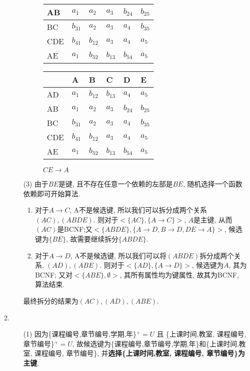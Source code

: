 \documentclass[10pt, a4paper]{article}
\begin{document}
\begin{enumerate}
\begin{enumerate}
\begin{figure}[H]
\begin{minipage}[b]{0.5\linewidth}
\begin{tabular}{|l|l|l|l|l|l|}
						AB  & $a_1$ & $a_2$  & $a_3$  & $b_{24}$ & $b_{25}$  \\ \hline
						BC  & $b_{31}$ &  $a_2$ & $a_3$ & $a_4$ & $b_{35}$ \\ \hline
						CDE & $b_{41}$ & $b_{12}$ & $a_3$ & $a_4$ & $a_5$ \\ \hline
						AE  & $a_1$ & $b_{52}$ & $b_{13}$ & $b_{54}$ & $a_5$ \\ \hline
						\end{tabular}
						\caption{$DE\to C$}\label{tab:5}
				\end{minipage}
				\begin{minipage}[b]{0.5\linewidth}
					\centering
					\begin{tabular}{|l|l|l|l|l|l|}
						\hline
							& A & B & C & D & E \\ \hline
						AD  & $a_1$ & $b_{12}$ & $b_{13}$  & $a_4$  & $a_5$  \\ \hline
						AB  & $a_1$ & $a_2$  & $a_3$  & $b_{24}$ & $b_{25}$  \\ \hline
						BC  & $b_{31}$ &  $a_2$ & $a_3$ & $a_4$ & $b_{35}$ \\ \hline
						CDE & $b_{41}$ & $b_{12}$ & $a_3$ & $a_4$ & $a_5$ \\ \hline
						AE  & $a_1$ & $b_{52}$ & $b_{13}$ & $b_{54}$ & $a_5$ \\ \hline
						\end{tabular}
						\caption{$CE\to A$}\label{tab:6}
				\end{minipage}
			\end{figure}
			\item[(3)] 由于$BE$是键, 且不存在任意一个依赖的左部是$BE$, 随机选择一个函数依赖即可开始算法.
			\begin{enumerate}
				\item 对于$A\to C$, A不是候选键, 所以我们可以拆分成两个关系$(AC), (ABDE)$. 则对于$<\{AC\}, \{A\to C\}>$, $A$是主键, 从而$(AC)$是BCNF;又$<\{ABDE\}, \{A\to D, B\to D, DE\to A\}>$, 候选键为$\{BE\}$, 故需要继续拆分$\{ABDE\}$.
				\item 对于$A\to D$, A不是候选键, 所以我们可以将$(ABDE)$拆分成两个关系, $(AD), (ABE)$. 则对于$<\{AD\}, \{A\to D\}>$, 候选键为$A$, 其为BCNF; 又对$<\{ABE\}, \emptyset >$, 其所有属性均为键属性, 故其为BCNF, 算法结束.
			\end{enumerate} 
			最终拆分的结果为$(AC), (AD), (ABE)$.
		\end{enumerate}
		\item \begin{enumerate}
			\item[(1)] 因为\{课程编号,章节编号,学期,年\}$^+ = U$ 且 \{上课时间,教室, 课程编号, 章节编号\}$^+ = U$, 故候选键为\{课程编号,章节编号,学期,年\}和\{上课时间,教室, 课程编号, 章节编号\}, 并\textbf{选择\{上课时间,教室, 课程编号, 章节编号\}为主键}.

\end{enumerate}
\end{enumerate}
\end{document}
